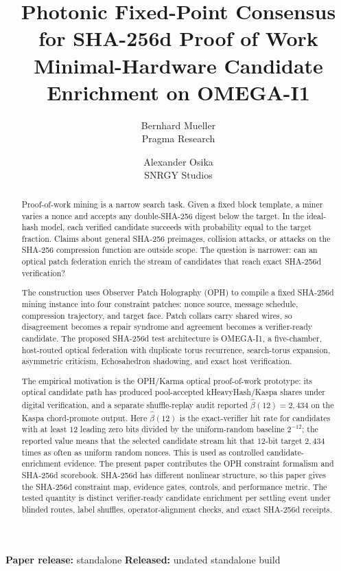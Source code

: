 \documentclass[11pt]{article}
\title{\textbf{Photonic Fixed-Point Consensus for SHA-256d Proof of Work}\\[0.25em]
\large Minimal-Hardware Candidate Enrichment on OMEGA-I1}
\author{Bernhard Mueller\\Pragma Research \and Alexander Osika\\SNRGY Studios}
\date{\OPHPaperReleaseDate}
\theoremstyle{definition}
\theoremstyle{remark}
\newcommand{\OPHPaperReleaseID}{standalone}
\newcommand{\OPHPaperReleaseDate}{undated standalone build}
\begin{document}
\maketitle
\begin{center}
\small\textbf{Paper release:} \OPHPaperReleaseID\quad
\textbf{Released:} \OPHPaperReleaseDate
\end{center}

\begin{abstract}
Proof-of-work mining is a narrow search task. Given a fixed block template, a
miner varies a nonce and accepts any double-SHA-256 digest below the target. In
the ideal-hash model, each verified candidate succeeds with probability equal
to the target fraction. Claims about general SHA-256 preimages, collision
attacks, or attacks on the SHA-256 compression function are outside scope. The
question is narrower: can an optical patch federation enrich the stream of
candidates that reach exact SHA-256d verification?

The construction uses Observer Patch Holography (OPH) to compile a fixed
SHA-256d mining instance into four constraint patches: nonce source, message
schedule, compression trajectory, and target face. Patch collars carry shared
wires, so disagreement becomes a repair syndrome and agreement becomes a
verifier-ready candidate. The proposed SHA-256d test architecture is
OMEGA-I1, a five-chamber, host-routed optical federation with duplicate torus
recurrence, search-torus expansion, asymmetric criticism, Echosahedron
shadowing, and exact host verification.

The empirical motivation is the OPH/Karma optical proof-of-work prototype: its
optical candidate path has produced pool-accepted kHeavyHash/Kaspa shares under
digital verification, and a separate shuffle-replay audit reported
\(\widehat\beta(12)=2{,}434\) on the Kaspa chord-promote output. Here
\(\widehat\beta(12)\) is the exact-verifier hit rate for candidates with at
least \(12\) leading zero bits divided by the uniform-random baseline \(2^{-12}\);
the reported value means that the selected candidate stream hit that \(12\)-bit
target \(2{,}434\) times as often as uniform random nonces. This is used as
controlled candidate-enrichment evidence. The present paper contributes the OPH
constraint formalism and SHA-256d scorebook.
SHA-256d has different nonlinear structure, so this paper gives the SHA-256d
constraint map, evidence gates, controls, and performance metric. The tested
quantity is distinct verifier-ready candidate enrichment per settling event
under blinded routes, label shuffles, operator-alignment checks, and exact
SHA-256d receipts.
\end{abstract}
\end{document}
